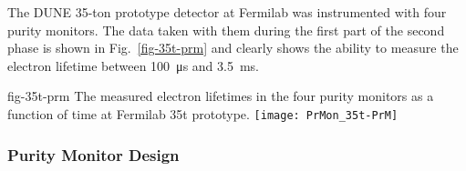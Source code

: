 The DUNE 35-ton prototype detector at Fermilab was instrumented with four purity monitors. The data taken with them during the first part of the second phase is shown in Fig.~\ref{fig-35t-prm} and clearly shows the ability to measure the electron lifetime between \SI{100}{\micro\second} and \SI{3.5}{\milli\second}.  

\begin{dunefigure}{fig-35t-prm}
  {The measured electron lifetimes in the four purity monitors as a function of time at Fermilab 35\si{t} prototype.}
  \texttt{[image: PrMon\_35t-PrM]}%
\end{dunefigure}


\subsubsection{Purity Monitor Design}

